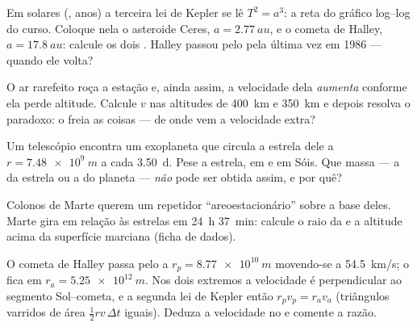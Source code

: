 \begin{exercise}[$\star\star$]\label{exo:g12:satellites-kepler:11}
Em  solares (, anos) a terceira lei de Kepler se lê
$T^2 = a^3$: a reta do gráfico log--log do curso. Coloque nela o asteroide Ceres,
$a = \qty{2.77}{au}$, e o cometa de Halley, $a = \qty{17.8}{au}$: calcule os dois
. Halley passou pelo  pela última vez em 1986 --- quando ele volta?
\end{exercise}

\begin{exercise}[$\star\star\star$]\label{exo:g12:satellites-kepler:12}
O ar rarefeito roça a estação e, ainda assim, a velocidade dela \emph{aumenta}
conforme ela perde altitude. Calcule $v$ nas altitudes de \qty{400}{km} e
\qty{350}{km} e depois resolva o paradoxo: o  freia as coisas --- de onde vem a
velocidade extra?
\end{exercise}

\begin{exercise}[$\star\star\star$]\label{exo:g12:satellites-kepler:13}
Um telescópio encontra um exoplaneta que circula a estrela dele a
$r = \qty{7.48e9}{m}$ a cada \qty{3.50}{d}. Pese a estrela, em  e em Sóis.
Que massa --- a da estrela ou a do planeta --- \emph{não} pode ser obtida assim, e por
quê?
\end{exercise}

\begin{exercise}[$\star\star\star$]\label{exo:g12:satellites-kepler:14}
Colonos de Marte querem um repetidor ``areoestacionário'' sobre a base deles. Marte
gira em relação às estrelas em \qty{24}{h} \qty{37}{min}: calcule o raio da  e a
altitude acima da superfície marciana (ficha de dados).
\end{exercise}

\begin{exercise}[$\star\star\star$]\label{exo:g12:satellites-kepler:15}
O cometa de Halley passa pelo  a $r_p = \qty{8.77e10}{m}$ movendo-se a
\qty{54.5}{km/s}; o  fica em $r_a = \qty{5.25e12}{m}$. Nos dois extremos a
velocidade é perpendicular ao segmento Sol--cometa, e a segunda lei de Kepler então
 $r_p v_p = r_a v_a$ (triângulos varridos de área $\tfrac12 r v\,\Delta t$
iguais). Deduza a velocidade no  e comente a razão.
\end{exercise}

